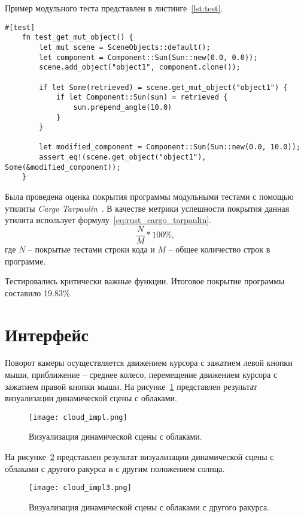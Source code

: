 Пример модульного теста представлен в листинге~\ref{lst:test}.
\begin{lstlisting}[style=rust, caption={Модульный тест проверки изменения компонента композита},label={lst:test}]
	#[test]
	fn test_get_mut_object() {
		let mut scene = SceneObjects::default();
		let component = Component::Sun(Sun::new(0.0, 0.0));
		scene.add_object("object1", component.clone());
		
		if let Some(retrieved) = scene.get_mut_object("object1") {
			if let Component::Sun(sun) = retrieved {
				sun.prepend_angle(10.0)
			}
		}
		
		let modified_component = Component::Sun(Sun::new(0.0, 10.0));
		assert_eq!(scene.get_object("object1"), Some(&modified_component));
	}
\end{lstlisting}

Была проведена оценка покрытия программы модульными тестами с помощью утилиты \textit{Cargo} \textit{Tarpaulin}~\cite{rust_cargo_tarpaulin}.
В качестве метрики успешности покрытия данная утилита использует формулу~\ref{eq:rust_cargo_tarpaulin}.
\begin{equation}
	\label{eq:rust_cargo_tarpaulin}
	\frac{N}{M} * 100\%,
\end{equation}
где $N$ -- покрытые тестами строки кода и $M$ -- общее количество строк в программе.

Тестировались критически важные функции. Итоговое покрытие программы составило 19.83\%.
\section{Интерфейс}
Поворот камеры осуществляется движением курсора с зажатием левой кнопки мыши, приближение -- среднее колесо, перемещение движением курсора с зажатием правой кнопки мыши.
На рисунке~\ref{fig:cloud-impl} представлен результат визуализации динамической сцены с облаками.
\begin{figure}[htb!]
	\centering
	\texttt{[image: cloud\_impl.png]}
	\caption{Визуализация динамической сцены с облаками.}
	\label{fig:cloud-impl}
\end{figure}

На рисунке~\ref{fig:cloud-impl2} представлен результат визуализации динамической сцены с облаками с другого ракурса и с другим положением солнца.
\begin{figure}[htb!]
	\centering
	\texttt{[image: cloud\_impl3.png]}
	\caption{Визуализация динамической сцены с облаками с другого ракурса.}
	\label{fig:cloud-impl2}
\end{figure}
\clearpage

